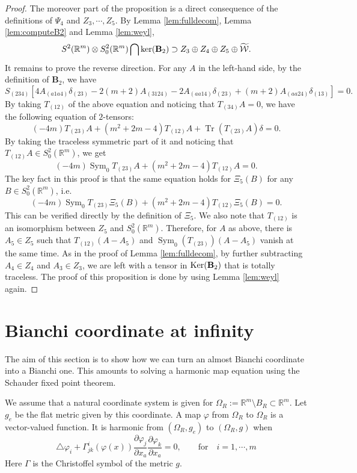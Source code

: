 \documentclass{amsart}
\newcommand{\Real}{\mathbb R}
\newcommand{\pfrac}[2]{\frac{\partial #1}{\partial #2}}
\numberwithin{equation}{section}
\begin{document}
\begin{proof}
	The moreover part of the proposition is a direct consequence of the definitions of $\Psi_4$ and $Z_3, \cdots , Z_5$. By Lemma \ref{lem:fulldecom}, Lemma \ref{lem:computeB2} and Lemma \ref{lem:weyl}, 
	\[
		S^2(\Real^m)\otimes S^2_0(\Real^m) \bigcap {\rm ker}({\mathbf B}_2) \supset Z_3\oplus {Z_4}\oplus Z_5\oplus \widetilde{\mathcal W}.
	\]
	It remains to prove the reverse direction. For any $A$ in the left-hand side, by the definition of ${\mathbf B}_2$, we have
		\[
			S_{(234)}[4A_{(a1a4)}\delta_{(23)}-2(m+2)A_{(3124)}-2A_{(aa14)}\delta_{(23)}+(m+2)A_{(aa24)}\delta_{(13)}]=0.
		\]
	By taking $T_{(12)}$ of the above equation and noticing that $T_{(34)}A=0$, we have the following equation of $2$-tensors:
	$$
	(-4m) T_{(23)}A + (m^2+2m-4) T_{(12)}A + \operatorname{Tr}( T_{(23)}A) \delta =0.
	$$
	By taking the traceless symmetric part of it and noticing that $T_{(12)}A \in S^2_0(\mathbb R^m)$, we get
	$$
	(-4m) \operatorname{Sym}_0 T_{(23)} A + (m^2+2m -4) T_{(12)}A =0.
	$$
	The key fact in this proof is that the same equation holds for $\Xi_5(B)$ for any $B\in S^2_0(\mathbb R^m)$, i.e.
	$$
	(-4m) \operatorname{Sym}_0 T_{(23)} \Xi_5(B) + (m^2+2m -4) T_{(12)} \Xi_5(B) =0.
	$$
	This can be verified directly by the definition of $\Xi_5$. We also note that $T_{(12)}$ is an isomorphism between $Z_5$ and $S^2_0(\mathbb R^m)$. Therefore, for $A$ as above, there is $A_5\in Z_5$ such that $T_{(12)}(A-A_5)$ and $\operatorname{Sym}_0(T_{(23)})(A-A_5)$ vanish at the same time. As in the proof of Lemma \ref{lem:fulldecom}, by further subtracting $A_4\in Z_4$ and $A_3\in Z_3$, we are left with a tensor in ${\rm Ker}({\mathbf B}_2)$ that is totally traceless. The proof of this proposition is done by using Lemma \ref{lem:weyl} again.
\end{proof}


\section{Bianchi coordinate at infinity}
\label{sec:analysis}

The aim of this section is to show how we can turn an almost Bianchi coordinate into a Bianchi one. This amounts to solving a harmonic map equation using the Schauder fixed point theorem.

We assume that a natural coordinate system is given for $\Omega_R:=\Real^m \setminus B_R\subset \Real^m$. Let $g_e$ be the flat metric given by this coordinate. A map $\varphi$ from $\Omega_R$ to $\Omega_R$ is a vector-valued function. It is harmonic from $(\Omega_R,g_e)$ to $(\Omega_R,g)$ when
\[
	\triangle \varphi_i + \Gamma^i_{jk}(\varphi(x)) \pfrac{\varphi_j}{x_a} \pfrac{\varphi_k}{x_a}=0, \qquad \text{for} \quad  i=1,\cdots ,m
\]
Here $\Gamma$ is the Christoffel symbol of the metric $g$.
\end{document}

